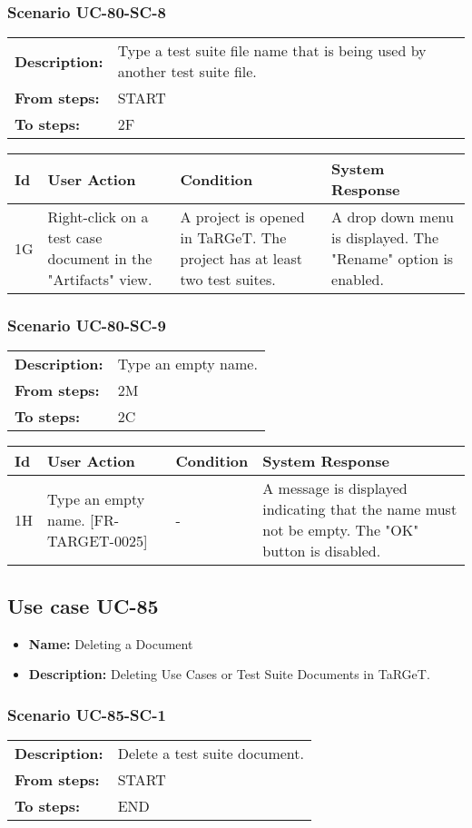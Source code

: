 \documentclass[a4paper,11pt]{article}
\newcommand{\bl}{\\ \hline}
\begin{document}
\subsubsection*{Scenario UC-80-SC-8}
\begin{tabular}{p{1in}p{4in}}
{\bf Description:} & Type a test suite file name that is being used by another test suite file. \\
{\bf From steps:} & START \\
{\bf To steps:} & 2F \\
\end{tabular}
 
\begin{tabular}{|p{0.8in}|p{1.6in}|p{1.6in}|p{1.6in}|}
\hline
Id & User Action & Condition & System Response  \bl 
1G & Right-click on a test case document in the "Artifacts" view. & A project is opened in TaRGeT. The project has at least two test suites. & A drop down menu is displayed. The "Rename" option is enabled. \bl 
\end{tabular}
\subsubsection*{Scenario UC-80-SC-9}
\begin{tabular}{p{1in}p{4in}}
{\bf Description:} & Type an empty name. \\
{\bf From steps:} & 2M \\
{\bf To steps:} & 2C \\
\end{tabular}
 
\begin{tabular}{|p{0.8in}|p{1.6in}|p{1.6in}|p{1.6in}|}
\hline
Id & User Action & Condition & System Response  \bl 
1H & Type an empty name. [FR-TARGET-0025] & - & A message is displayed indicating that the name must not be empty. The "OK" button is disabled. \bl 
\end{tabular}
\subsection*{Use case UC-85}
\begin{itemize}
\item {\bf Name: }Deleting a Document
\item {\bf Description: }Deleting Use Cases or Test Suite Documents in TaRGeT.
\end{itemize}
\subsubsection*{Scenario UC-85-SC-1}
\begin{tabular}{p{1in}p{4in}}
{\bf Description:} & Delete a test suite document. \\
{\bf From steps:} & START \\
{\bf To steps:} & END \\
\end{tabular}
 
\end{document}
